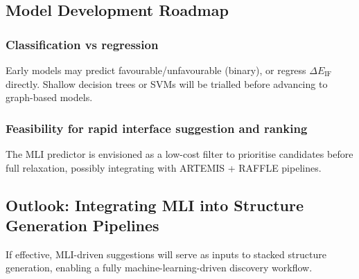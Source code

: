 \subsection{Model Development Roadmap}

\subsubsection{Classification vs regression}

Early models may predict favourable/unfavourable (binary), or regress $\Delta E_\mathrm{IF}$ directly. Shallow decision trees or SVMs will be trialled before advancing to graph-based models.

\subsubsection{Feasibility for rapid interface suggestion and ranking}

The MLI predictor is envisioned as a low-cost filter to prioritise candidates before full relaxation, possibly integrating with ARTEMIS + RAFFLE pipelines.

\subsection{Outlook: Integrating MLI into Structure Generation Pipelines}

If effective, MLI-driven suggestions will serve as inputs to stacked structure generation, enabling a fully machine-learning-driven discovery workflow.

